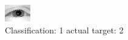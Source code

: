 \begin{figure}[h!]
\begin{center}
\includegraphics[width=0.60\columnwidth]{figures/ID2336_class_1_target_2.png}
\end{center}
\caption{ Classification: 1 actual target: 2}
\label{fig:ID2336_class_1_target_2}
\end{figure}
